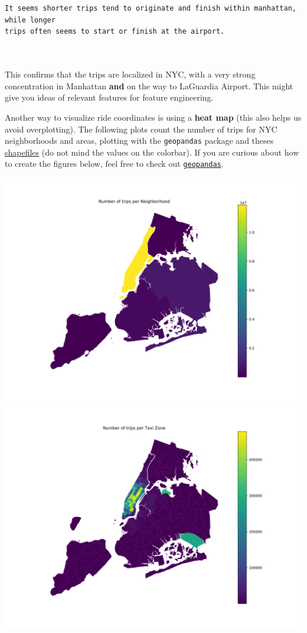\documentclass[11pt]{article}
\makeatletter
\def\maxwidth{\ifdim\Gin@nat@width>\linewidth\linewidth
    \else\Gin@nat@width\fi}
\let\Oldincludegraphics\includegraphics
\renewcommand{\includegraphics}[1]{\Oldincludegraphics[width=.8\maxwidth]{#1}}
\makeatother
\begin{document}
    \begin{Verbatim}[commandchars=\\\{\}]


It seems shorter trips tend to originate and finish within manhattan, while longer 
trips often seems to start or finish at the airport. 



    \end{Verbatim}

    This confirms that the trips are localized in NYC, with a very strong
concentration in Manhattan \textbf{and} on the way to LaGuardia Airport.
This might give you ideas of relevant features for feature engineering.

Another way to visualize ride coordinates is using a \textbf{heat map}
(this also helps us avoid overplotting). The following plots count the
number of trips for NYC neighborhoods and areas, plotting with the
\texttt{geopandas} package and theses
\href{https://geo.nyu.edu/catalog/nyu_2451_36743}{shapefiles} (do not
mind the values on the colorbar). If you are curious about how to create
the figures below, feel free to check out
\href{http://geopandas.org/}{\texttt{geopandas}}.

    \includegraphics{figs/chloro_NY_neighborhoods.png}
\includegraphics{figs/chloro_NY_taxi_zones.png}
\end{document}
